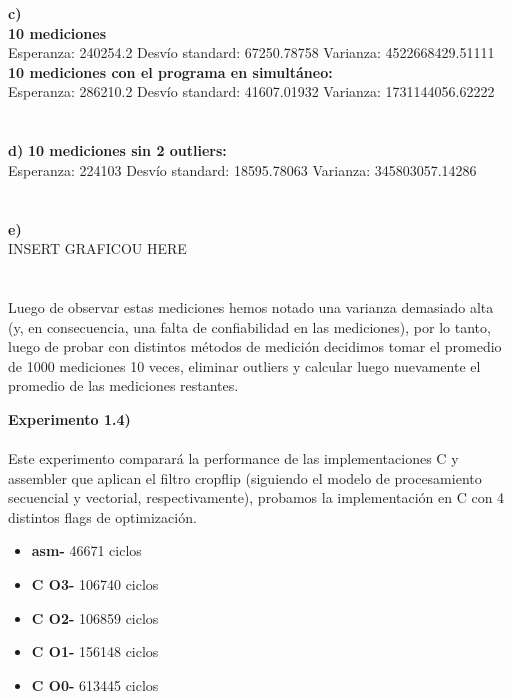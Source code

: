\documentclass[a4paper]{article}
\begin{document}
\noindent \textbf{c)} \\ \textbf{10 mediciones}\\Esperanza: 240254.2  Desv\'{i}o standard: 67250.78758  Varianza: 4522668429.51111\\
\noindent \textbf{10 mediciones con el programa en simult\'{a}neo:}\\Esperanza: 286210.2  Desv\'{i}o standard: 41607.01932
Varianza: 1731144056.62222\\ \\ \\
\textbf{d)} \textbf{10 mediciones sin 2 outliers:}\\Esperanza: 224103  Desv\'{i}o standard: 18595.78063  Varianza: 345803057.14286\\ \\ \\

\noindent \textbf{e)} \\ INSERT GRAFICOU HERE \\ \\ \\

Luego de observar estas mediciones hemos notado una varianza demasiado alta (y, en consecuencia, una falta de confiabilidad en las mediciones), por lo tanto, luego de probar con distintos m\'{e}todos de medici\'{o}n decidimos tomar el promedio de 1000 mediciones 10 veces, eliminar outliers y calcular luego nuevamente el promedio de las mediciones restantes.

\newpage

\textbf{Experimento 1.4)}\\ \\

Este experimento comparar\'{a} la performance de las implementaciones C y assembler que aplican el filtro cropflip (siguiendo el modelo de procesamiento secuencial y vectorial, respectivamente), probamos la implementaci\'{o}n en C con 4 distintos flags de optimizaci\'{o}n.

\begin{itemize}

\item \textbf{asm-} 46671 ciclos\\
\item \textbf{C O3-} 106740 ciclos\\
\item \textbf{C O2-} 106859 ciclos\\
\item \textbf{C O1-} 156148 ciclos\\
\item \textbf{C O0-} 613445 ciclos\\ \\ \\

\end{itemize}
\end{document}
